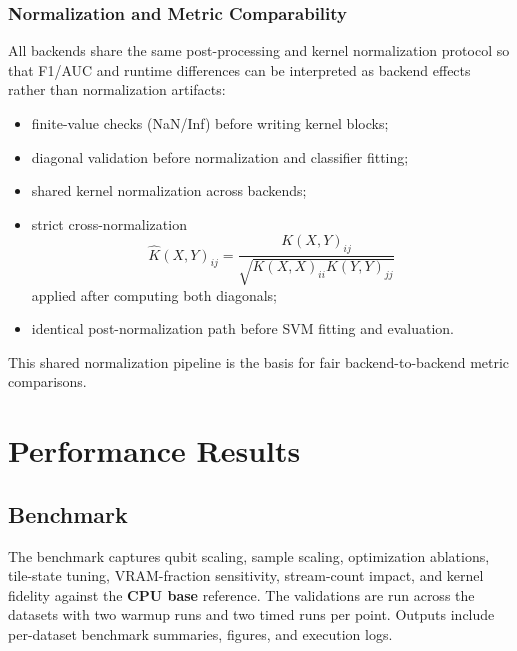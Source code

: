 \documentclass[10pt,twocolumn,letterpaper]{article}
\begin{document}
\subsubsection{Normalization and Metric Comparability}
All backends share the same post-processing and kernel normalization protocol so that F1/AUC and runtime differences can be interpreted as backend effects 
rather than normalization artifacts:
\begin{itemize}
    \item finite-value checks (NaN/Inf) before writing kernel blocks;
    \item diagonal validation before normalization and classifier fitting;
    \item shared kernel normalization across backends;
    \item strict cross-normalization
    \[
    \hat K(X,Y)_{ij} = \frac{K(X,Y)_{ij}}{\sqrt{K(X,X)_{ii}K(Y,Y)_{jj}}}
    \]
    applied after computing both diagonals;
    \item identical post-normalization path before SVM fitting and evaluation.
\end{itemize}

This shared normalization pipeline is the basis for fair backend-to-backend metric comparisons.

\section{Performance Results}
\subsection{Benchmark}
The benchmark captures qubit scaling, sample scaling, optimization ablations, tile-state tuning, VRAM-fraction sensitivity, 
stream-count impact, and kernel fidelity against the \textbf{CPU base} reference. 
The validations are run across the datasets with two warmup runs and two timed runs per point. Outputs include 
per-dataset benchmark summaries, figures, and execution logs.
\end{document}
